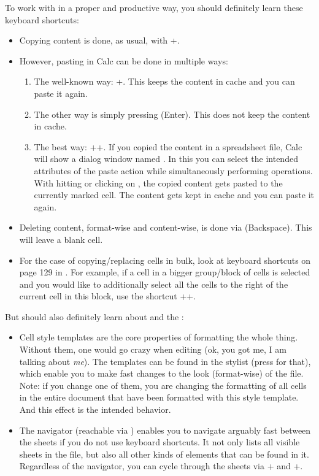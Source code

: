To work with \tfn in a proper and productive way, you should definitely learn these keyboard shortcuts:
\begin{itemize}
	\item Copying content is done, as usual, with +.
	\item However, pasting in Calc can be done in multiple ways:
	\begin{enumerate}
		\item The well-known way: +.
		This keeps the content in cache and you can paste it again.
		\item The other way is simply pressing \keystroke{\( \hookleftarrow \)} (Enter).
		This does not keep the content in cache.
		\item The best way: ++.
		If you copied the content in a spreadsheet file, Calc will show a dialog window named .
		In this you can select the intended attributes of the paste action while simultaneously performing operations.
		With hitting \keystroke{\( \hookleftarrow \)} or clicking on , the copied content gets pasted to the currently marked cell.
		The content gets kept in cache and you can paste it again.
	\end{enumerate}
	\item Deleting content, format-wise and content-wise, is done via \keystroke{\( \longleftarrow \)} (Backspace).
	This will leave a blank cell.
	\item For the case of copying/replacing cells in bulk, look at keyboard shortcuts on page 129 in .
	For example, if a cell in a bigger group/block of cells is selected and you would like to additionally select all the cells to the right of the current cell in this block, use the shortcut ++\keystroke{\( \rightarrow \)}.
\end{itemize}

But should also definitely learn about  and the :
\begin{itemize}
	\item Cell style templates are the core properties of formatting the whole thing.
	Without them, one would go crazy when editing \tfn (ok, you got me, I am talking about \emph{me}).
	The templates can be found in the stylist (press  for that), which enable you to make fast changes to the look (format-wise) of the file.
	Note: if you change one of them, you are changing the formatting of all cells in the entire document that have been formatted with this style template.
	And this effect is the intended behavior.
	\item The navigator (reachable via ) enables you to navigate arguably fast between the sheets if you do not use keyboard shortcuts.
	It not only lists all visible sheets in the file, but also all other kinds of elements that can be found in it.
	Regardless of the navigator, you can cycle through the sheets via + and +.
\end{itemize}

